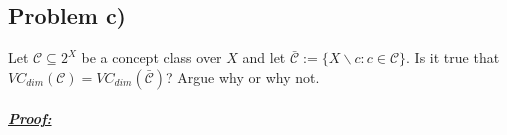 \subsection*{Problem c)}
Let $\mathcal{C} \subseteq 2^X$ be a concept class over $X$ and let $\bar{\mathcal{C}} := \{X \backslash c : c \in \mathcal{C}\}$. Is it
true that $VC_{dim}(\mathcal{C}) = VC_{dim}(\bar{\mathcal{C}})$? Argue why or why not.\\
\\
\textbf{\underline{\textit{Proof:}}}\\